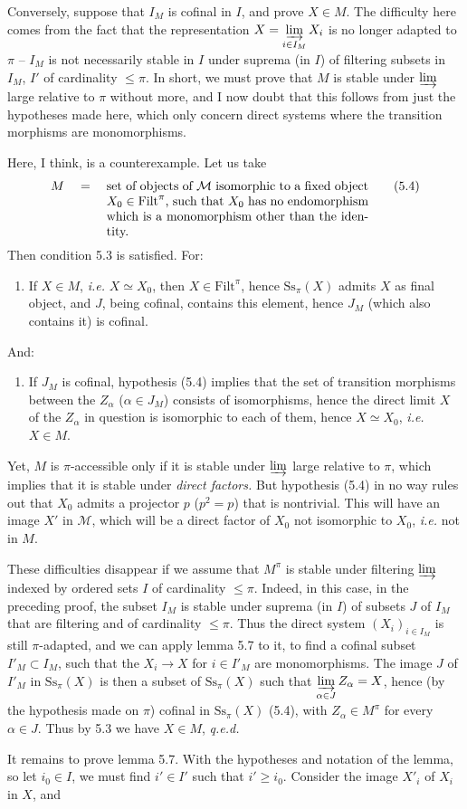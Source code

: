 \documentclass[11pt]{article}
\newcommand{\msp}[1]{\marginpar{\footnotesize [#1]}}
\newcommand{\cM}{\mathcal{M}}
\newcommand{\Filt}{\mathrm{Filt}}
\newcommand{\Ss}{\mathrm{Ss}}
\begin{document}
Conversely, suppose that $I_M$ is cofinal in $I$, and prove $X \in M$. The difficulty here comes from the fact that the representation $X = \varinjlim\limits_{i\in I_M} X_i$ is no longer adapted to $\pi$ -- $I_M$ is not necessarily stable in $I$ under suprema (in $I$) of filtering subsets in $I_M$, $I'$ of cardinality $\leq \pi$. In short, we must
\msp{page 54}
prove that $M$ is stable under $\varinjlim$ large relative to $\pi$ without more, and I now doubt that this follows from just the hypotheses made here, which only concern direct systems where the transition morphisms are monomorphisms.

Here, I think, is a counterexample. Let us take
\[
M \quad = \quad \parbox[t]{0.6\textwidth}{set of objects of $\cM$ isomorphic to a fixed object $X_0 \in \Filt^{\pi}$, such that $X_0$ has no endomorphism which is a monomorphism other than the identity.}
\tag*{(5.4)}
\]
Then condition 5.3 is satisfied. For:
\begin{enumerate}[nosep]
\item[\textit{a})] If $X \in M$, \textit{i.e.} $X \simeq X_0$, then $X \in \Filt^{\pi}$, hence $\Ss_{\pi}(X)$ admits $X$ as final object, and $J$, being cofinal, contains this element, hence $J_M$ (which also contains it) is cofinal.
\end{enumerate}
And:
\begin{enumerate}[nosep]
\item[\textit{b})] If $J_M$ is cofinal, hypothesis (5.4) implies that the set of transition morphisms between the $Z_{\alpha}$ ($\alpha \in J_M$) consists of isomorphisms, hence the direct limit $X$ of the $Z_{\alpha}$ in question is isomorphic to each of them, hence $X \simeq X_0$, \textit{i.e.} $X \in M$.
\end{enumerate}
Yet, $M$ is $\pi$-accessible only if it is stable under $\varinjlim$ large relative to $\pi$, which implies that it is stable under \textit{direct factors.} But hypothesis
\msp{page 55}
(5.4) in no way rules out that $X_0$ admits a projector $p$ ($p^{2} = p$) that is nontrivial. This will have an image $X'$ in $\cM$, which will be a direct factor of $X_0$ not isomorphic to $X_0$, \textit{i.e.} not in $M$.

These difficulties disappear if we assume that $M^{\pi}$ is stable under filtering $\varinjlim$ indexed by ordered sets $I$ of cardinality $\leq \pi$. Indeed, in this case, in the preceding proof, the subset $I_M$ is stable under suprema (in $I$) of subsets $J$ of $I_M$ that are filtering and of cardinality $\leq \pi$. Thus the direct system $(X_i)_{i\in I_M}$ is still $\pi$-adapted, and we can apply lemma 5.7 to it, to find a cofinal subset $I'_M \subset I_M$, such that the $X_i \longrightarrow X$ for $i \in I'_M$ are monomorphisms. The image $J$ of $I'_M$ in $\Ss_{\pi}(X)$ is then a subset of $\Ss_{\pi}(X)$ such that $\varinjlim\limits_{\alpha\in J} Z_{\alpha} = X$, hence (by the hypothesis made on $\pi$) cofinal in $\Ss_{\pi}(X)$ (5.4), with $Z_{\alpha} \in M^{\pi}$ for every $\alpha \in J$. Thus by 5.3 we have $X \in M$, \textit{q.e.d.}

\msp{page 56}
It remains to prove lemma 5.7. With the hypotheses and notation of the lemma, so let $i_0 \in I$, we must find $i' \in I'$ such that $i' \geq i_0$. Consider the image $X'_i$ of $X_i$ in $X$, and
\end{document}
